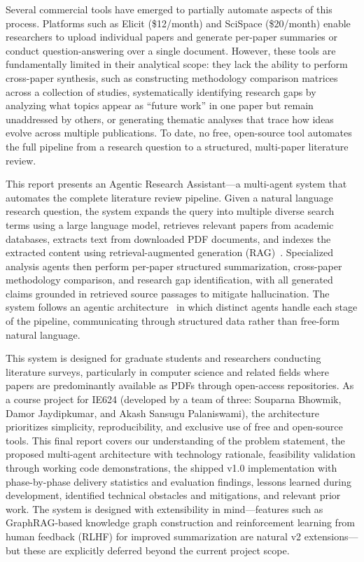 \documentclass[12pt,a4paper]{article}
\begin{document}
Several commercial tools have emerged to partially automate aspects of this process. Platforms such as Elicit (\$12/month) and SciSpace (\$20/month) enable researchers to upload individual papers and generate per-paper summaries or conduct question-answering over a single document. However, these tools are fundamentally limited in their analytical scope: they lack the ability to perform cross-paper synthesis, such as constructing methodology comparison matrices across a collection of studies, systematically identifying research gaps by analyzing what topics appear as ``future work'' in one paper but remain unaddressed by others, or generating thematic analyses that trace how ideas evolve across multiple publications. To date, no free, open-source tool automates the full pipeline from a research question to a structured, multi-paper literature review.

This report presents an Agentic Research Assistant---a multi-agent system that automates the complete literature review pipeline. Given a natural language research question, the system expands the query into multiple diverse search terms using a large language model, retrieves relevant papers from academic databases, extracts text from downloaded PDF documents, and indexes the extracted content using retrieval-augmented generation (RAG)~\citep{lewis2020rag}. Specialized analysis agents then perform per-paper structured summarization, cross-paper methodology comparison, and research gap identification, with all generated claims grounded in retrieved source passages to mitigate hallucination. The system follows an agentic architecture~\citep{singh2025agenticrag} in which distinct agents handle each stage of the pipeline, communicating through structured data rather than free-form natural language.

This system is designed for graduate students and researchers conducting literature surveys, particularly in computer science and related fields where papers are predominantly available as PDFs through open-access repositories. As a course project for IE624 (developed by a team of three: Souparna Bhowmik, Damor Jaydipkumar, and Akash Sansugu Palaniswami), the architecture prioritizes simplicity, reproducibility, and exclusive use of free and open-source tools. This final report covers our understanding of the problem statement, the proposed multi-agent architecture with technology rationale, feasibility validation through working code demonstrations, the shipped v1.0 implementation with phase-by-phase delivery statistics and evaluation findings, lessons learned during development, identified technical obstacles and mitigations, and relevant prior work. The system is designed with extensibility in mind---features such as GraphRAG-based knowledge graph construction and reinforcement learning from human feedback (RLHF) for improved summarization are natural v2 extensions---but these are explicitly deferred beyond the current project scope.
\end{document}
